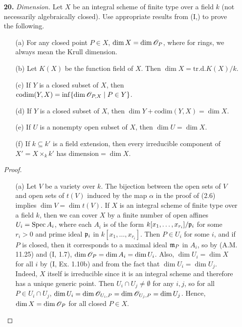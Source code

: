 \documentclass{article}
\begin{document}
\begin{enumerate} [label=\textbf{\arabic*.}, leftmargin=0em]
\begin{proof}
    Suppose $\mathscr{P}$ does not hold for $X$, and set $X_1 = X$. Recursively define $X_{n + 1}$ to be any proper closed subset of $X_{n}$ such that $\mathscr{P}$ does not hold. This is a nonterminating decreasing sequence of closed subsets of $X$ by construction, a contradiction.
\end{proof}

\item[\textbf{20.}] \textit{Dimension.} Let $X$ be an integral scheme of finite type over a field $k$ (not necessarily algebraically closed). Use appropriate results from (I,) to prove the following.
\begin{itemize}
    \item[(a)] For any closed point $P \in X$, $\dim{X} = \dim{\mathscr{O}_P}$, where for rings, we always mean the Krull dimension.
    \item[(b)] Let $K(X)$ be the function field of $X$. Then $\dim{X} = \text{tr.d.} K(X) / k$.
    \item[(c)] If $Y$ is a closed subset of $X$, then $\text{codim}(Y, X) = \inf\{\dim{\mathscr{O}_{P, X}} \mid P \in Y\}$.
    \item[(d)] If $Y$ is a closed subset of $X$, then $\dim{Y} + \text{codim}(Y, X) = \dim{X}$.
    \item[(e)] If $U$ is a nonempty open subset of $X$, then $\dim{U} = \dim{X}$.
    \item[(f)] If $k \subseteq k'$ is a field extension, then every irreducible component of $X' = X \times_k k'$ has $\text{dimension} = \dim{X}$.
\end{itemize}

\begin{proof} $ $ \vspace{0pt}
\begin{itemize} [leftmargin=0cm]
    \item[(a)] Let $V$ be a variety over $k$. The bijection between the open sets of $V$ and open sets of $t(V)$ induced by the map $\alpha$ in the proof of (2.6) implies $\dim{V} = \dim{t(V)}$.
    If $X$ is an integral scheme of finite type over a field $k$, then we can cover $X$ by a finite number of open affines $U_i = \operatorname{Spec}{A_i}$, where each $A_i$ is of the form $k[x_1, \dots, x_{r_i}] / \mathfrak{p}_i$ for some $r_i > 0$ and prime ideal $\mathfrak{p}_i$ in $k[x_1, \dots, x_{r_i}]$. Then $P \in U_i$ for some $i$, and if $P$ is closed, then it corresponds to a maximal ideal $\mathfrak{m}_P$ in $A_i$, so by (A.M. 11.25) and (I, 1.7), $\dim{\mathscr{O}_P} = \dim{A_i} = \dim{U_i}$. 
    Also, $\dim{U_i} = \dim{X}$ for all $i$ by (I, Ex. 1.10b) and from the fact that $\dim{U_i} = \dim{U_j}$.
    Indeed, $X$ itself is irreducible since it is an integral scheme and therefore has a unique generic point. Then $U_i \cap U_j \neq \emptyset$ for any $i, j$, so for all $P \in U_i \cap U_j$, $\dim{U_i} = \dim{\mathscr{O}_{U_i, P}} = \dim{\mathscr{O}_{U_j, P}} = \dim{U_j}$. Hence, $\dim{X} = \dim{\mathscr{O}_P}$ for all closed $P \in X$.


\end{itemize}
\end{proof}
\end{enumerate}
\end{document}
